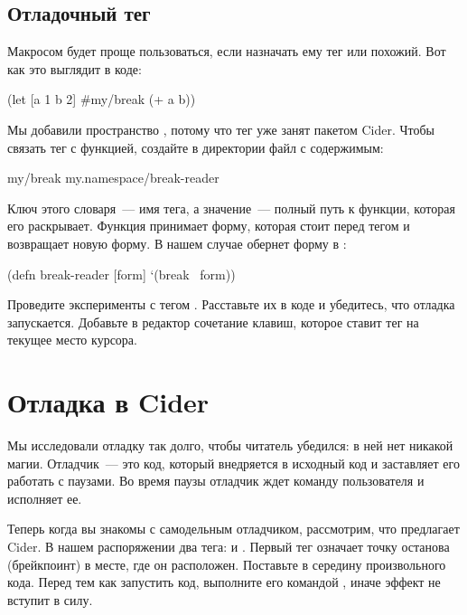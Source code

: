 \subsection{Отладочный тег}

Макросом  будет проще пользоваться, если назначать ему тег  или похожий. Вот как это выглядит в коде:

\begin{english}
  \begin{clojure}
(let [a 1 b 2]
  #my/break (+ a b))
  \end{clojure}
\end{english}

Мы добавили пространство , потому что тег  уже занят пакетом Cider. Чтобы связать тег с функцией, создайте в директории  файл  с содержимым:

\begin{english}
  \begin{clojure}
{my/break my.namespace/break-reader}
  \end{clojure}
\end{english}

Ключ этого словаря~--- имя тега, а значение~--- полный путь к функции, которая его раскрывает. Функция принимает форму, которая стоит перед тегом и возвращает новую форму. В нашем случае  обернет форму в :

\begin{english}
  \begin{clojure}
(defn break-reader [form]
  `(break ~form))
  \end{clojure}
\end{english}

Проведите эксперименты с тегом . Расставьте их в коде и убедитесь, что отладка запускается. Добавьте в редактор сочетание клавиш, которое ставит тег на текущее место курсора.

\section{Отладка в Cider}

Мы исследовали отладку так долго, чтобы читатель убедился: в ней нет никакой магии. Отладчик~--- это код, который внедряется в исходный код и заставляет его работать с паузами. Во время паузы отладчик ждет команду пользователя и исполняет ее.

Теперь когда вы знакомы с самодельным отладчиком, рассмотрим, что предлагает Cider. В нашем распоряжении два тега:  и . Первый тег означает точку останова (брейкпоинт) в месте, где он расположен. Поставьте  в середину произвольного кода. Перед тем как запустить код, выполните его командой , иначе эффект не вступит в силу.

